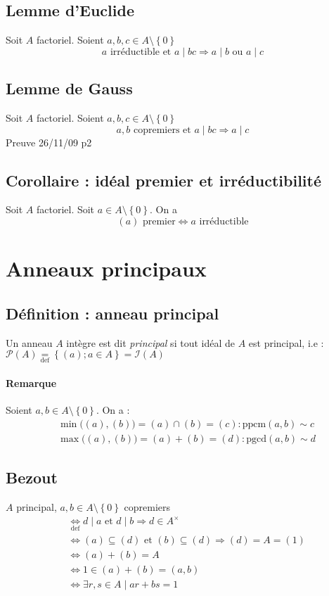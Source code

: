 \documentclass[reqno,a4paper,10pt]{report}
\newcommand{\set}[1]{\left\lbrace #1 \right\rbrace} %
\newcommand{\so}{\Rightarrow}
\newcommand{\soo}{\Longrightarrow}
\newcommand{\pgcd}{\mathrm{pgcd}} %
\newcommand{\ppcm}{\mathrm{ppcm}}
\newcommand{\tdef}[1]{\underset{\text{def}}{ #1 }}
\newcommand{\et}{\text{ et }}
\newcommand{\ou}{\text{ ou }}
\begin{document}
\subsection{Lemme d'Euclide}
Soit $A$ factoriel. Soient $a,b,c \in A\setminus\set{0}$
\[a \text{ irréductible et } a \mid bc \soo a \mid b \ou a\mid c\]

\subsection{Lemme de Gauss}
Soit $A$ factoriel. Soient $a,b,c \in A\setminus\set{0}$
\[a, b \text{ copremiers et } a\mid bc \soo a\mid c\]
  Preuve 26/11/09 p2

\subsection{Corollaire : idéal premier et irréductibilité}
Soit $A$ factoriel. Soit $a \in A\setminus\set{0}$. On a
\[(a) \text{ premier} \iff a \text{ irréductible}\]

\section{Anneaux principaux}
\subsection{Définition : anneau principal}
Un anneau $A$ intègre est dit \emph{principal} si tout idéal de $A$ est
principal, i.e : $\mathcal P(A)\tdef =\set{(a); a \in A} = \mathcal I(A)$

\paragraph{Remarque}
Soient $a,b \in A\setminus\set{0}$. On a :
\begin{eqnarray*}
  &\min\big( (a), (b)\big) = (a) \cap (b) = (c) : \ppcm(a,b) \sim c\\
  &\max\big( (a), (b)\big) = (a) + (b) = (d) : \pgcd(a,b) \sim d
\end{eqnarray*}

\subsection{Bezout}
$A$ principal, $a,b \in A\setminus\set{0}$ copremiers
\begin{align*}
  &\tdef{\iff} d \mid a \et d \mid b \so d \in A^\times\\
  &\iff (a) \subseteq (d) \et (b) \subseteq (d) \so (d)=A=(1)\\
  &\iff (a) + (b) = A\\ %
  &\iff 1 \in (a) + (b) = (a,b)\\
  &\iff \exists r,s \in A \mid ar+bs=1
\end{align*}
\end{document}
